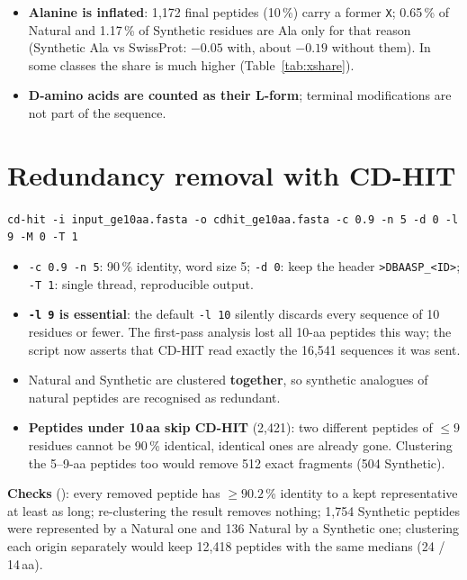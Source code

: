 \documentclass[11pt,a4paper]{article}
\newcommand{\amin}{\,aa}
\begin{document}
\begin{caution}
\begin{itemize}
\item \textbf{Alanine is inflated}: 1{,}172 final peptides (10\,\%) carry a former \texttt{X}; 0.65\,\% of Natural and 1.17\,\% of Synthetic residues are Ala only for that reason
      (Synthetic Ala vs SwissProt: $-0.05$ with, about $-0.19$ without them). In some classes the share is much higher (Table~\ref{tab:xshare}).
\item \textbf{D-amino acids are counted as their L-form}; terminal modifications are not part of the sequence.
\end{itemize}
\end{caution}

\section{Redundancy removal with CD-HIT}
\begin{center}\texttt{cd-hit -i input\_ge10aa.fasta -o cdhit\_ge10aa.fasta -c 0.9 -n 5 -d 0 -l 9 -M 0 -T 1}\end{center}
\begin{itemize}
\item \texttt{-c 0.9 -n 5}: 90\,\% identity, word size 5; \texttt{-d 0}: keep the header \texttt{>DBAASP\_<ID>}; \texttt{-T 1}: single thread, reproducible output.
\item \textbf{\texttt{-l 9} is essential}: the default \texttt{-l 10} silently discards every sequence of 10 residues or fewer. The first-pass analysis lost all 10-aa peptides this way;
      the script now asserts that CD-HIT read exactly the 16{,}541 sequences it was sent.
\item Natural and Synthetic are clustered \textbf{together}, so synthetic analogues of natural peptides are recognised as redundant.
\item \textbf{Peptides under 10\amin{} skip CD-HIT} (2{,}421): two different peptides of $\leq 9$ residues cannot be 90\,\% identical, identical ones are already gone.
      Clustering the 5--9-aa peptides too would remove 512 exact fragments (504 Synthetic).
\end{itemize}
\textbf{Checks} (): every removed peptide has $\geq 90.2$\,\% identity to a kept representative at least as long; re-clustering the result removes nothing;
1{,}754 Synthetic peptides were represented by a Natural one and 136 Natural by a Synthetic one; clustering each origin separately would keep 12{,}418 peptides with the same medians (24 / 14\amin).
\end{document}
